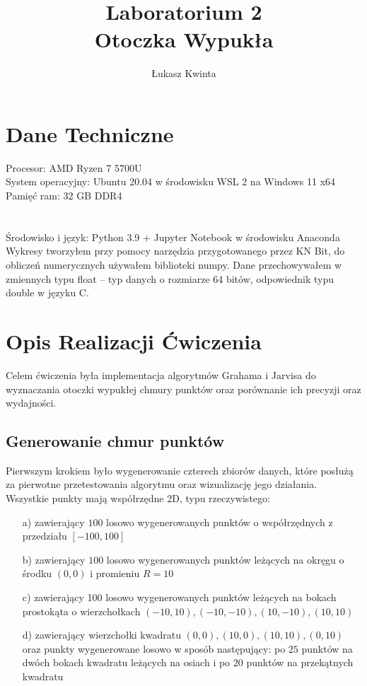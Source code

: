 \documentclass[a4paper]{article}
\title{\fontsize{30pt}{30pt}\selectfont Laboratorium 2 \\ Otoczka Wypukła}
\author{\fontsize{20pt}{20pt}\selectfont Łukasz Kwinta}
\date{}
\begin{document}
\maketitle
\Large
\vspace*{\fill}
\section{Dane Techniczne}
Procesor: AMD Ryzen 7 5700U\\
System operacyjny: Ubuntu 20.04 w środowisku WSL 2 na Windows 11 x64\\
Pamięć ram: 32 GB DDR4\\
\\
\\
Środowisko i język: Python 3.9 + Jupyter Notebook w środowisku Anaconda\\
Wykresy tworzyłem przy pomocy narzędzia przygotowanego przez KN Bit, 
do obliczeń numerycznych używałem biblioteki numpy.
 Dane przechowywałem w zmiennych typu float – typ danych o rozmiarze 64 bitów, 
 odpowiednik typu double w języku C.
\pagebreak
\section{Opis Realizacji Ćwiczenia}
Celem ćwiczenia była implementacja algorytmów Grahama i Jarvisa do wyznaczania
otoczki wypukłej chmury punktów oraz porównanie ich precyzji oraz wydajności.

\subsection{Generowanie chmur punktów}
Pierwszym krokiem było wygenerowanie czterech zbiorów danych, które posłużą za
pierwotne przetestowania algorytmu oraz wizualizację jego działania. Wszystkie punkty
mają współrzędne 2D, typu rzeczywistego:

\begin{itemize}
    \item [a)] zawierający $100$ losowo wygenerowanych punktów o współrzędnych z przedziału $[-100, 100]$
    \item [b)] zawierający $100$ losowo wygenerowanych punktów leżących na okręgu o środku $(0,0)$ i promieniu $R=10$
    \item [c)] zawierający 100 losowo wygenerowanych punktów leżących na bokach prostokąta o wierzchołkach $(-10, 10), (-10,-10), (10,-10), (10,10)$
    \item [d)] zawierający wierzchołki kwadratu $(0, 0), (10, 0), (10, 10), (0, 10)$ oraz punkty wygenerowane losowo w sposób następujący: 
    po $25$ punktów na dwóch bokach kwadratu leżących na osiach i po $20$ punktów na przekątnych kwadratu
\end{itemize}
\end{document}
